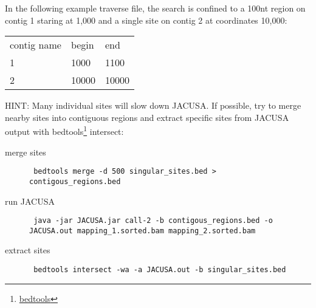 \documentclass[12pt, a4paper]{article}
\begin{document}
In the following example traverse file, the search is confined to a 100nt region on contig 1
staring at 1,000 and a single site on contig 2 at coordinates 10,000:
\begin{table}
  \begin{tabular}{lll}
    contig name & begin & end \\
    1 & 1000 & 1100 \\
    2 & 10000 & 10000
  \end{tabular}
\end{table}
HINT: Many individual sites will slow down JACUSA. If possible, try to merge nearby sites into
contiguous regions and extract specific sites from JACUSA output with
bedtools\footnote{\href{http://bedtools.readthedocs.org/en/latest/}{bedtools}} intersect:
\begin{description}
\item[merge sites] \begin{verbatim} bedtools merge -d 500 singular_sites.bed > contigous_regions.bed
\end{verbatim}
\item[run JACUSA] \begin{verbatim} java -jar JACUSA.jar call-2 -b contigous_regions.bed -o
JACUSA.out mapping_1.sorted.bam mapping_2.sorted.bam \end{verbatim}
\item[extract sites] \begin{verbatim} bedtools intersect -wa -a JACUSA.out -b singular_sites.bed
\end{verbatim}
\end{description}
\end{document}
